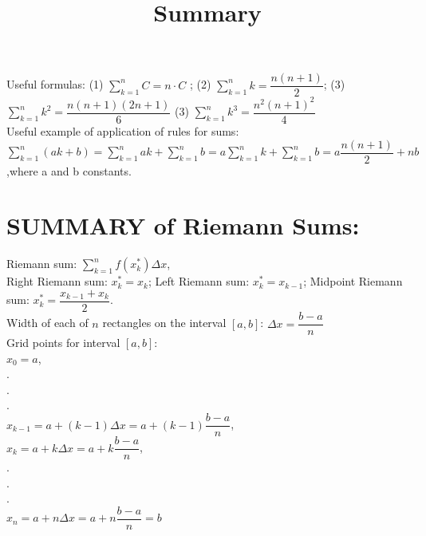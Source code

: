 \documentclass{ximera}
\title[Summary]{Summary}
\begin{document}
\begin{abstract} \end{abstract}
\maketitle


Useful formulas:\hspace{0.4in}   (1) $\displaystyle \sum_{k=1}^{n}C =n\cdot C$ ;\hspace{0.4in}    (2)  $\displaystyle \sum_{k=1}^{n} k =\dfrac{n(n+1)}{2}$;  \hspace{0.4in}      (3) $\displaystyle \sum_{k=1}^{n} k^2 =\dfrac{n(n+1)(2n+1)}{6}$ \hspace{0.4in}      (3) $\displaystyle \sum_{k=1}^{n} k^3 =\dfrac{n^2(n+1)^2}{4}$\\[1.5em]
Useful example of application of rules for sums: \\[1em] $\displaystyle \sum_{k=1}^{n}(ak+b) =\displaystyle \sum_{k=1}^{n}ak + \displaystyle \sum_{k=1}^{n}b=a\displaystyle \sum_{k=1}^{n}k + \displaystyle \sum_{k=1}^{n}b=a\dfrac{n(n+1)}{2}+nb$,\hspace{0.1in}where a and b constants.\hspace{0.1in}  \\[2.5em]
\section*{SUMMARY of Riemann Sums:}

Riemann sum:\hspace{0.1in}  $\displaystyle \sum_{k=1}^{n}f(x_k^*)\Delta x$, \\[1.5em]
Right Riemann sum: $x_k^*=x_k$; \hspace{0.1in} Left Riemann sum: $x_k^*=x_{k-1}$; \hspace{0.1in}Midpoint Riemann sum: $x_k^*=\dfrac{x_{k-1}+x_k}{2}$.\\[1em]
Width of each  of $n$ rectangles on the interval $[a,b]$:\hspace{0.1in} $\Delta x=\dfrac{b-a}{n}$\\[1em]
Grid points for interval $[a,b]$:\\[1em]
$x_0=a$,\\[0.2em]
$.$\\[0.2em]
$ .$\\ [0.2em]
$ .$\\[0.2em]
$x_{k-1}=a+(k-1)\Delta x=a+(k-1)\dfrac{b-a}{n}$,\\[1em] \hspace{0.2in} $x_k=a+k\Delta x=a+k\dfrac{b-a}{n}$,\\[0.3em]
$.$\\[0.2em]
$ .$\\ [0.2em]
$.$\\[0.2em]
$x_n=a+n\Delta x=a+n\dfrac{b-a}{n}=b$
\end{document}
